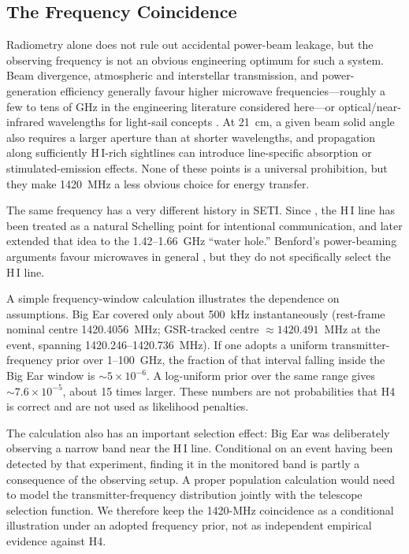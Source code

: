 \documentclass[crop]{CSL}
\begin{document}
\subsection{The Frequency Coincidence}

Radiometry alone does not rule out accidental power-beam leakage, but the observing frequency is not an obvious engineering optimum for such a system. Beam divergence, atmospheric and interstellar transmission, and power-generation efficiency generally favour higher microwave frequencies---roughly a few to tens of GHz in the engineering literature considered here---or optical/near-infrared wavelengths for light-sail concepts \citep{benford2010}. At 21~cm, a given beam solid angle also requires a larger aperture than at shorter wavelengths, and propagation along sufficiently H\,I-rich sightlines can introduce line-specific absorption or stimulated-emission effects. None of these points is a universal prohibition, but they make 1420~MHz a less obvious choice for energy transfer.

The same frequency has a very different history in SETI. Since \citet{cocconi1959}, the H\,I line has been treated as a natural Schelling point for intentional communication, and \citet{oliver1971} later extended that idea to the 1.42--1.66~GHz ``water hole.'' Benford's power-beaming arguments favour microwaves in general \citep{benford2021}, but they do not specifically select the H\,I line.

A simple frequency-window calculation illustrates the dependence on assumptions. Big Ear covered only about 500~kHz instantaneously (rest-frame nominal centre 1420.4056~MHz; GSR-tracked centre $\approx1420.491$~MHz at the event, spanning 1420.246--1420.736~MHz). If one adopts a uniform transmitter-frequency prior over 1--100~GHz, the fraction of that interval falling inside the Big Ear window is $\sim5\times10^{-6}$. A log-uniform prior over the same range gives $\sim7.6\times10^{-5}$, about 15 times larger. These numbers are not probabilities that H4 is correct and are not used as likelihood penalties.

The calculation also has an important selection effect: Big Ear was deliberately observing a narrow band near the H\,I line. Conditional on an event having been detected by that experiment, finding it in the monitored band is partly a consequence of the observing setup. A proper population calculation would need to model the transmitter-frequency distribution jointly with the telescope selection function. We therefore keep the 1420-MHz coincidence as a conditional illustration under an adopted frequency prior, not as independent empirical evidence against H4.
\end{document}
